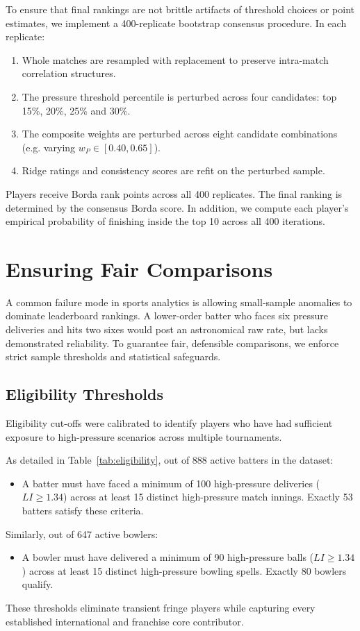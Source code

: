 \documentclass[11pt,a4paper]{article}
\begin{document}
To ensure that final rankings are not brittle artifacts of threshold choices or point estimates, we implement a 400-replicate bootstrap consensus procedure. In each replicate:
\begin{enumerate}
    \item Whole matches are resampled with replacement to preserve intra-match correlation structures.
    \item The pressure threshold percentile is perturbed across four candidates: top 15\%, 20\%, 25\% and 30\%.
    \item The composite weights are perturbed across eight candidate combinations (e.g. varying $w_P \in [0.40, 0.65]$).
    \item Ridge ratings and consistency scores are refit on the perturbed sample.
\end{enumerate}
Players receive Borda rank points across all 400 replicates. The final ranking is determined by the consensus Borda score. In addition, we compute each player's empirical probability of finishing inside the top 10 across all 400 iterations.

\section{Ensuring Fair Comparisons}
\label{sec:fairness}

A common failure mode in sports analytics is allowing small-sample anomalies to dominate leaderboard rankings. A lower-order batter who faces six pressure deliveries and hits two sixes would post an astronomical raw rate, but lacks demonstrated reliability. To guarantee fair, defensible comparisons, we enforce strict sample thresholds and statistical safeguards.

\subsection{Eligibility Thresholds}
Eligibility cut-offs were calibrated to identify players who have had sufficient exposure to high-pressure scenarios across multiple tournaments. 



As detailed in Table~\ref{tab:eligibility}, out of 888 active batters in the dataset:
\begin{itemize}
    \item A batter must have faced a minimum of 100 high-pressure deliveries ($LI \ge 1.34$) across at least 15 distinct high-pressure match innings. Exactly 53 batters satisfy these criteria.
\end{itemize}
Similarly, out of 647 active bowlers:
\begin{itemize}
    \item A bowler must have delivered a minimum of 90 high-pressure balls ($LI \ge 1.34$) across at least 15 distinct high-pressure bowling spells. Exactly 80 bowlers qualify.
\end{itemize}
These thresholds eliminate transient fringe players while capturing every established international and franchise core contributor.
\end{document}
